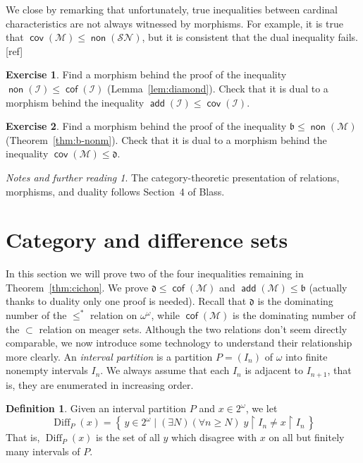 \documentclass[11pt,oneside,a4paper]{amsbook}
\newcommand{\set}[1]{\left\{\,#1\,\right\}}
\newcommand{\Meager}{\mathcal M}
\DeclareMathOperator{\add}{\mathsf{add}}
\DeclareMathOperator{\non}{\mathsf{non}}
\DeclareMathOperator{\cov}{\mathsf{cov}}
\DeclareMathOperator{\cof}{\mathsf{cof}}
\DeclareMathOperator{\Diff}{Diff}
\theoremstyle{definition}
\newtheorem{exercise}{Exercise}[section]
\theoremstyle{plain}
\theoremstyle{definition}
\newtheorem{definition}[theorem]{Definition}
\theoremstyle{remark}
\newtheorem*{notes}{Notes and further reading}
\numberwithin{equation}{section}
\numberwithin{figure}{section}
\begin{document}
We close by remarking that unfortunately, true inequalities between cardinal characteristics are not always witnessed by morphisms. For example, it is true that $\cov(\Meager)\leq\non(\mathcal{SN})$, but it is consistent that the dual inequality fails.
[ref] %

\begin{exercise}
  Find a morphism behind the proof of the inequality $\non(\mathcal I)\leq\cof(\mathcal I)$ (Lemma~\ref{lem:diamond}). Check that it is dual to a morphism behind the inequality $\add(\mathcal I)\leq\cov(\mathcal I)$.
\end{exercise}

\begin{exercise}
  Find a morphism behind the proof of the inequality $\mathfrak b\leq\non(\Meager)$ (Theorem~\ref{thm:b-nonm}). Check that it is dual to a morphism behind the inequality $\cov(\Meager)\leq\mathfrak d$.
\end{exercise}

\begin{notes}
  The category-theoretic presentation of relations, morphisms, and duality follows Section~4 of Blass.
\end{notes}


\newpage
\section{Category and difference sets}

In this section we will prove two of the four inequalities remaining in Theorem~\ref{thm:cichon}. We prove $\mathfrak d\leq\cof(\Meager)$ and $\add(\Meager)\leq\mathfrak b$ (actually thanks to duality only one proof is needed). Recall that $\mathfrak d$ is the dominating number of the $\leq^*$ relation on $\omega^\omega$, while $\cof(\Meager)$ is the dominating number of the $\subset$ relation on meager sets. Although the two relations don't seem directly comparable, we now introduce some technology to understand their relationship more clearly. An \emph{interval partition} is a partition $P=(I_n)$ of $\omega$ into finite nonempty intervals $I_n$. We always assume that each $I_n$ is adjacent to $I_{n+1}$, that is, they are enumerated in increasing order.

\begin{definition}
  Given an interval partition $P$ and $x\in2^\omega$, we let
  \[\Diff_P(x)=\set{y\in2^\omega\mid (\exists N)(\forall n\geq N)\;y\restriction I_n\neq x\restriction I_n}
  \]
  That is, $\Diff_P(x)$ is the set of all $y$ which disagree with $x$ on all but finitely many intervals of $P$.
\end{definition}
\end{document}
